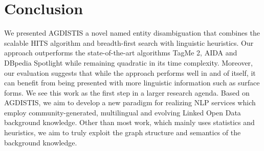 \documentclass{llncs}
\begin{document}



\section{Conclusion}
\label{sec:conclusion}
We presented AGDISTIS a novel named entity disambiguation that combines the scalable HITS algorithm and breadth-first search with linguistic heuristics.
Our approach outperforms the state-of-the-art algorithms TagMe 2, AIDA and DBpedia Spotlight while remaining quadratic in its time complexity. 
Moreover, our evaluation suggests that while the approach performs well in and of itself, it can benefit from being presented with more linguistic information such as surface forms. 
We see this work as the first step in a larger research agenda.
Based on AGDISTIS, we aim to develop a new paradigm for realizing NLP services which employ community-generated, multilingual and evolving Linked Open Data background knowledge.
Other than most work, which mainly uses statistics and heuristics, we aim to truly exploit the graph structure and semantics of the background knowledge.
\end{document}
